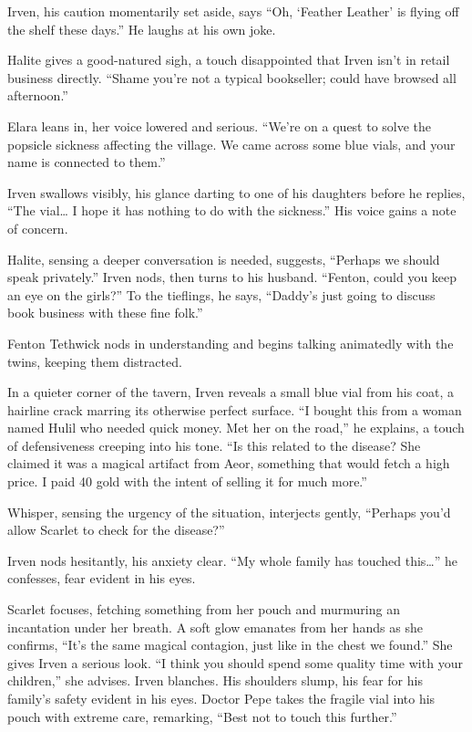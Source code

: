 \documentclass[
  letterpaper,12pt,twoside,twocolumn,openany,
  nodeprecatedcode,bg=full]{dndbook}
\begin{document}
Irven, his caution momentarily set aside, says ``Oh, `Feather Leather'
is flying off the shelf these days.'' He laughs at his own joke.

Halite gives a good-natured sigh, a touch disappointed that Irven isn't
in retail business directly. ``Shame you're not a typical bookseller;
could have browsed all afternoon.''

Elara leans in, her voice lowered and serious. ``We're on a quest to
solve the popsicle sickness affecting the village. We came across some
blue vials, and your name is connected to them.''

Irven swallows visibly, his glance darting to one of his daughters
before he replies, ``The vial\ldots{} I hope it has nothing to do with
the sickness.'' His voice gains a note of concern.

Halite, sensing a deeper conversation is needed, suggests, ``Perhaps we
should speak privately.'' Irven nods, then turns to his husband.
``Fenton, could you keep an eye on the girls?'' To the tieflings, he
says, ``Daddy's just going to discuss book business with these fine
folk.''

Fenton Tethwick nods in understanding and begins talking animatedly with
the twins, keeping them distracted.

In a quieter corner of the tavern, Irven reveals a small blue vial from
his coat, a hairline crack marring its otherwise perfect surface. ``I
bought this from a woman named Hulil who needed quick money. Met her on
the road,'' he explains, a touch of defensiveness creeping into his
tone. ``Is this related to the disease? She claimed it was a magical
artifact from Aeor, something that would fetch a high price. I paid 40
gold with the intent of selling it for much more.''

Whisper, sensing the urgency of the situation, interjects gently,
``Perhaps you'd allow Scarlet to check for the disease?''

Irven nods hesitantly, his anxiety clear. ``My whole family has touched
this\ldots{}'' he confesses, fear evident in his eyes.

Scarlet focuses, fetching something from her pouch and murmuring an
incantation under her breath. A soft glow emanates from her hands as she
confirms, ``It's the same magical contagion, just like in the chest we
found.'' She gives Irven a serious look. ``I think you should spend some
quality time with your children,'' she advises. Irven blanches. His
shoulders slump, his fear for his family's safety evident in his eyes.
Doctor Pepe takes the fragile vial into his pouch with extreme care,
remarking, ``Best not to touch this further.''
\end{document}
